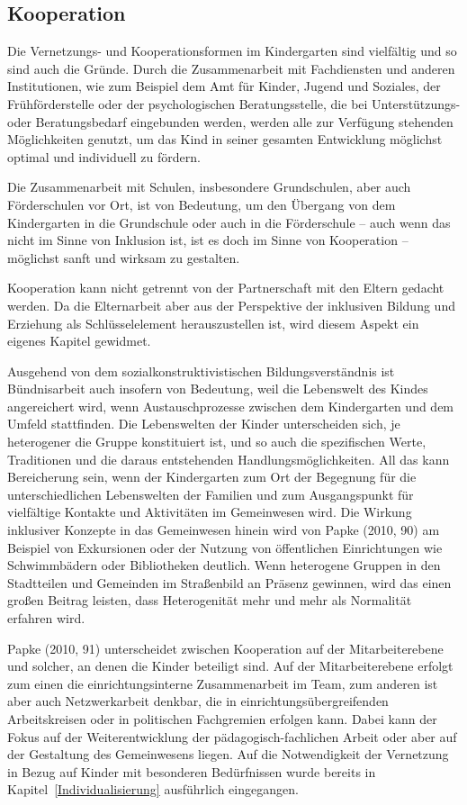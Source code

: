 \subsection{Kooperation}
\label{Kooperation}
Die Vernetzungs- und Kooperationsformen im Kindergarten sind vielfältig und so sind auch die Gründe. 
Durch die Zusammenarbeit mit Fachdiensten und anderen Institutionen, wie zum Beispiel dem Amt für Kinder, Jugend und Soziales, der Frühförderstelle oder der psychologischen Beratungsstelle, die bei Unterstützungs- oder Beratungsbedarf eingebunden werden, werden alle zur Verfügung stehenden Möglichkeiten genutzt, um das Kind in seiner gesamten Entwicklung möglichst optimal und individuell zu fördern.

Die Zusammenarbeit mit Schulen, insbesondere Grundschulen, aber auch Förderschulen vor Ort, ist von Bedeutung, um den Übergang von dem Kindergarten in die Grundschule oder auch in die Förderschule -- auch wenn das nicht im Sinne von Inklusion ist, ist es doch im Sinne von Kooperation -- möglichst sanft und wirksam zu gestalten. 

Kooperation kann nicht getrennt von der Partnerschaft mit den Eltern gedacht werden. Da die Elternarbeit aber aus der Perspektive der inklusiven Bildung und Erziehung als Schlüsselelement herauszustellen ist, wird diesem Aspekt ein eigenes Kapitel gewidmet. 

Ausgehend von dem sozialkonstruktivistischen Bildungsverständnis ist Bündnisarbeit auch insofern von Bedeutung, weil die Lebenswelt des Kindes angereichert wird, wenn Austauschprozesse zwischen dem Kindergarten und dem Umfeld stattfinden. Die Lebenswelten der Kinder unterscheiden sich, je heterogener die Gruppe konstituiert ist, und so auch die spezifischen Werte, Traditionen und die daraus entstehenden Handlungsmöglichkeiten. All das kann Bereicherung sein, wenn der Kindergarten zum Ort der Begegnung für die unterschiedlichen Lebenswelten der Familien und zum Ausgangspunkt für vielfältige Kontakte und Aktivitäten im Gemeinwesen wird.  
Die Wirkung inklusiver Konzepte in das Gemeinwesen hinein wird von Papke (2010, 90) am Beispiel von Exkursionen oder der Nutzung von öffentlichen Einrichtungen wie Schwimmbädern oder Bibliotheken deutlich. Wenn heterogene Gruppen in den Stadtteilen und Gemeinden im Straßenbild an Präsenz gewinnen, wird das einen großen Beitrag leisten, dass Heterogenität mehr und mehr als Normalität erfahren wird.   
 
Papke (2010, 91) unterscheidet zwischen Kooperation auf der Mitarbeiterebene und solcher, an denen die Kinder beteiligt sind. Auf der Mitarbeiterebene erfolgt zum einen die einrichtungsinterne Zusammenarbeit im Team, zum anderen ist aber auch Netzwerkarbeit denkbar, die in einrichtungsübergreifenden Arbeitskreisen oder in politischen Fachgremien erfolgen kann. Dabei kann der Fokus auf der Weiterentwicklung der pädagogisch-fachlichen Arbeit oder aber auf der Gestaltung des Gemeinwesens liegen.
Auf die Notwendigkeit der Vernetzung in Bezug auf Kinder mit besonderen Bedürfnissen wurde bereits in Kapitel~\ref{Individualisierung} ausführlich eingegangen.     

